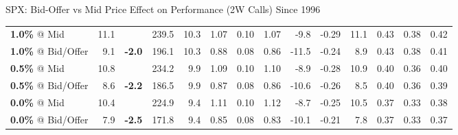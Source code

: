 \documentclass{beamer}
\begin{document}
\begin{frame}{\normalsize SPX: Bid-Offer vs Mid Price Effect on Performance (2W Calls) Since 1996}
\begin{table}
{\begin{tabular}{lrcrrrrrrrrrrr}
\addlinespace
{\bf 1.0\%} @ Mid & 11.1 & & 239.5 & 10.3 & 1.07 & 0.10 & 1.07 & -9.8 & -0.29 & 11.1 & 0.43 & 0.38 & 0.42\\
{\bf 1.0\%} @ Bid/Offer & 9.1 & {\bf \color{red} -2.0} & 196.1 & 10.3 & 0.88 & 0.08 & 0.86 & -11.5 & -0.24 & 8.9 & 0.43 & 0.38 & 0.41\\
\addlinespace
{\bf 0.5\%} @ Mid & 10.8 & & 234.2 & 9.9 & 1.09 & 0.10 & 1.10 & -8.9 & -0.28 & 10.9 & 0.40 & 0.36 & 0.40\\
{\bf 0.5\%} @ Bid/Offer & 8.6 & {\bf \color{red} -2.2} & 186.5 & 9.9 & 0.87 & 0.08 & 0.86 & -10.6 & -0.26 & 8.5 & 0.40 & 0.36 & 0.39\\
\addlinespace
{\bf 0.0\%} @ Mid & 10.4 & & 224.9 & 9.4 & 1.11 & 0.10 & 1.12 & -8.7 & -0.25 & 10.5 & 0.37 & 0.33 & 0.38\\
{\bf 0.0\%} @ Bid/Offer & 7.9 & {\bf \color{red} -2.5} & 171.8 & 9.4 & 0.85 & 0.08 & 0.83 & -10.1 & -0.21 & 7.8 & 0.37 & 0.33 & 0.37\\
\bottomrule
\end{tabular}
}
\end{table}
\end{frame}
\end{document}
